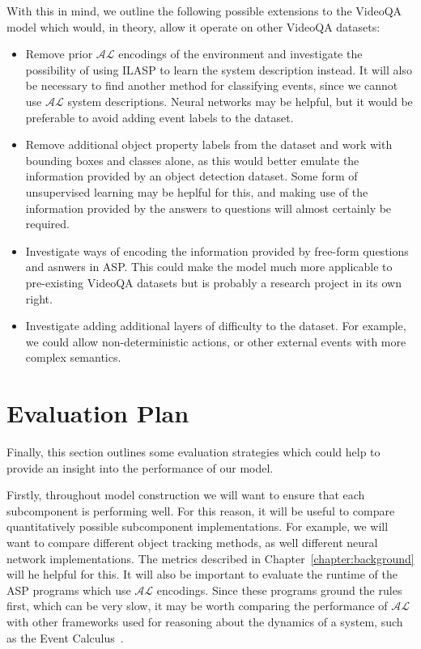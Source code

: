 \documentclass[../interim.tex]{subfiles}
\begin{document}
With this in mind, we outline the following possible extensions to the VideoQA model which would, in theory, allow it operate on other VideoQA datasets:
\begin{itemize}
  \item Remove prior $\mathcal{AL}$ encodings of the environment and investigate the possibility of using ILASP to learn the system description instead. It will also be necessary to find another method for classifying events, since we cannot use $\mathcal{AL}$ system descriptions. Neural networks may be helpful, but it would be preferable to avoid adding event labels to the dataset.

  \item Remove additional object property labels from the dataset and work with bounding boxes and classes alone, as this would better emulate the information provided by an object detection dataset. Some form of unsupervised learning may be heplful for this, and making use of the information provided by the answers to questions will almost certainly be required.

  \item Investigate ways of encoding the information provided by free-form questions and asnwers in ASP. This could make the model much more applicable to pre-existing VideoQA datasets but is probably a research project in its own right.

  \item Investigate adding additional layers of difficulty to the dataset. For example, we could allow non-deterministic actions, or other external events with more complex semantics.
\end{itemize}

\section{Evaluation Plan}

Finally, this section outlines some evaluation strategies which could help to provide an insight into the performance of our model.

Firstly, throughout model construction we will want to ensure that each subcomponent is performing well. For this reason, it will be useful to compare quantitatively possible subcomponent implementations. For example, we will want to compare different object tracking methods, as well different neural network implementations. The metrics described in Chapter~\ref{chapter:background} will he helpful for this. It will also be important to evaluate the runtime of the ASP programs which use $\mathcal{AL}$ encodings. Since these programs ground the rules first, which can be very slow, it may be worth comparing the performance of $\mathcal{AL}$ with other frameworks used for reasoning about the dynamics of a system, such as the Event Calculus~\cite{event-calc}.
\end{document}
